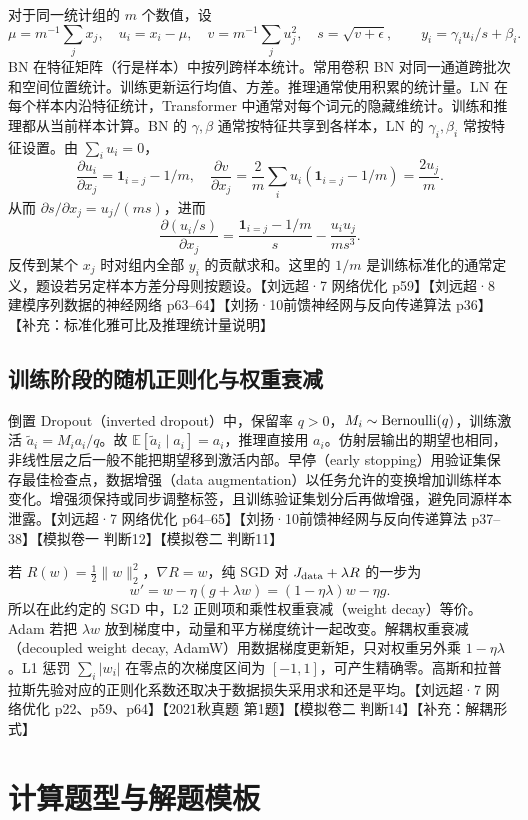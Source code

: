 \documentclass[UTF8,a4paper,zihao=-4,fontset=fandol]{ctexrep}
\begin{document}
对于同一统计组的 $m$ 个数值，设
\[
 \mu=m^{-1}\sum_j x_j,\quad u_i=x_i-\mu,\quad
 v=m^{-1}\sum_j u_j^2,\quad s=\sqrt{v+\epsilon},
 \qquad y_i=\gamma_i u_i/s+\beta_i.
\]
BN 在特征矩阵（行是样本）中按列跨样本统计。常用卷积 BN 对同一通道跨批次和空间位置统计。训练更新运行均值、方差。推理通常使用积累的统计量。LN 在每个样本内沿特征统计，Transformer 中通常对每个词元的隐藏维统计。训练和推理都从当前样本计算。BN 的 $\gamma,\beta$ 通常按特征共享到各样本，LN 的 $\gamma_i,\beta_i$ 常按特征设置。由 $\sum_i u_i=0$，
\[
 \frac{\partial u_i}{\partial x_j}=\mathbf1_{i=j}-1/m,
 \quad
 \frac{\partial v}{\partial x_j}
 =\frac2m\sum_i u_i(\mathbf1_{i=j}-1/m)=\frac{2u_j}{m}.
\]
从而 $\partial s/\partial x_j=u_j/(ms)$，进而
\[
 \frac{\partial (u_i/s)}{\partial x_j}
 =\frac{\mathbf1_{i=j}-1/m}{s}-\frac{u_i u_j}{m s^3}.
\]
反传到某个 $x_j$ 时对组内全部 $y_i$ 的贡献求和。这里的 $1/m$ 是训练标准化的通常定义，题设若另定样本方差分母则按题设。【刘远超·7 网络优化 p59】【刘远超·8 建模序列数据的神经网络 p63--64】【刘扬·10前馈神经网与反向传递算法 p36】【补充：标准化雅可比及推理统计量说明】

\subsection*{训练阶段的随机正则化与权重衰减}

倒置 Dropout（inverted dropout）中，保留率 $q>0$，$M_i\sim{\rm Bernoulli}(q)$，训练激活 $\widetilde a_i=M_i a_i/q$。故 $\mathbb E[\widetilde a_i\mid a_i]=a_i$，推理直接用 $a_i$。仿射层输出的期望也相同，非线性层之后一般不能把期望移到激活内部。早停（early stopping）用验证集保存最佳检查点，数据增强（data augmentation）以任务允许的变换增加训练样本变化。增强须保持或同步调整标签，且训练验证集划分后再做增强，避免同源样本泄露。【刘远超·7 网络优化 p64--65】【刘扬·10前馈神经网与反向传递算法 p37--38】【模拟卷一 判断12】【模拟卷二 判断11】

若 $R(w)=\tfrac12\|w\|^2_2$，$\nabla R=w$，纯 SGD 对 $J_{\rm data}+\lambda R$ 的一步为
\[
 w' = w-\eta(g+\lambda w)=(1-\eta\lambda)w-\eta g.
\]
所以在此约定的 SGD 中，L2 正则项和乘性权重衰减（weight decay）等价。Adam 若把 $\lambda w$ 放到梯度中，动量和平方梯度统计一起改变。解耦权重衰减（decoupled weight decay, AdamW）用数据梯度更新矩，只对权重另外乘 $1-\eta\lambda$。L1 惩罚 $\sum_i|w_i|$ 在零点的次梯度区间为 $[-1,1]$，可产生精确零。高斯和拉普拉斯先验对应的正则化系数还取决于数据损失采用求和还是平均。【刘远超·7 网络优化 p22、p59、p64】【2021秋真题 第1题】【模拟卷二 判断14】【补充：解耦形式】

\section{计算题型与解题模板}
\end{document}
